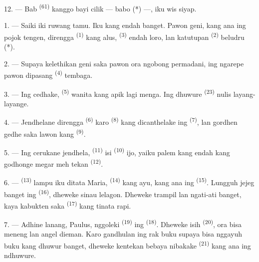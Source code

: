 12. --- Bab  \textsuperscript{(61)} kanggo bayi cilik
— babo (*) —, iku wis siyap.

\VUsaut{5.0mm}
\VUsaut{3.0mm}

1. --- Saiki iki ruwang tamu. Iku  kang endah banget.
Pawon geni, kang ana ing pojok tengen, direngga 
\textsuperscript{(1)} kang alus, 
\textsuperscript{(3)} endah loro, lan katutupan 
\textsuperscript{(2)} beludru (*).

2. --- Supaya kelethikan geni saka pawon ora ngobong permadani, ing
ngarepe pawon dipasang  \textsuperscript{(4)}
tembaga.

3. --- Ing cedhake,  \textsuperscript{(5)} wanita kang
apik lagi menga. Ing dhuwure 
\textsuperscript{(23)} nulis layang-layange.

4. --- Jendhelane direngga  \textsuperscript{(6)}
karo  \textsuperscript{(8)} kang dicanthelake ing
 \textsuperscript{(7)}, lan gordhen gedhe saka lawon
kang  \textsuperscript{(9)}.

5. --- Ing cerukane jendhela,  \textsuperscript{(11)}
isi  \textsuperscript{(10)} ijo, yaiku palem kang endah
kang godhonge megar meh tekan 
\textsuperscript{(12)}.

6. ---  \textsuperscript{(13)} lampu iku ditata
Maria,  \textsuperscript{(14)} kang ayu, kang ana ing
 \textsuperscript{(15)}. Lungguh jejeg banget ing
 \textsuperscript{(16)}, dheweke sinau lelagon. Dheweke
trampil lan ngati-ati banget, kaya kabukten saka  \textsuperscript{(17)} kang tinata rapi.

\VUsaut{5.0mm}
\VUsaut{3.0mm}

7. --- Adhine lanang, Paulus, nggoleki 
\textsuperscript{(19)} ing  \textsuperscript{(18)}.
Dheweke isih  \textsuperscript{(20)}, ora bisa meneng
lan angel dieman. Karo gandhulan ing rak buku supaya bisa nggayuh buku
kang dhuwur banget, dheweke kentekan bebaya nibakake  \textsuperscript{(21)} kang ana ing ndhuwure.

